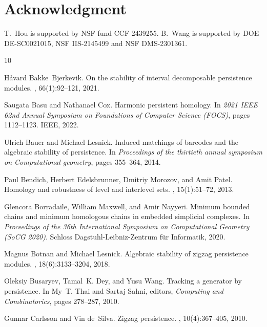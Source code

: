 \documentclass[10pt,a4paper]{amsart}
\theoremstyle{definition}
\theoremstyle{remark}
\begin{document}
\section*{Acknowledgment}
T.\ Hou is supported by NSF fund CCF 2439255. B.\ Wang is supported by DOE DE-SC0021015, NSF IIS-2145499 and NSF DMS-2301361. 
\begin{thebibliography}{10}

H{\aa}vard Bakke~Bjerkevik.
\newblock On the stability of interval decomposable persistence modules.
, 66(1):92--121, 2021.

Saugata Basu and Nathanael Cox.
\newblock Harmonic persistent homology.
\newblock In {\em 2021 IEEE 62nd Annual Symposium on Foundations of Computer
  Science (FOCS)}, pages 1112--1123. IEEE, 2022.

Ulrich Bauer and Michael Lesnick.
\newblock Induced matchings of barcodes and the algebraic stability of
  persistence.
\newblock In {\em Proceedings of the thirtieth annual symposium on
  Computational geometry}, pages 355--364, 2014.

Paul Bendich, Herbert Edelsbrunner, Dmitriy Morozov, and Amit Patel.
\newblock Homology and robustness of level and interlevel sets.
, 15(1):51--72, 2013.

Glencora Borradaile, William Maxwell, and Amir Nayyeri.
\newblock Minimum bounded chains and minimum homologous chains in embedded
  simplicial complexes.
\newblock In {\em Proceedings of the 36th International Symposium on
  Computational Geometry (SoCG 2020)}. Schloss Dagstuhl-Leibniz-Zentrum f{\"u}r
  Informatik, 2020.

Magnus Botnan and Michael Lesnick.
\newblock Algebraic stability of zigzag persistence modules.
, 18(6):3133--3204, 2018.

Oleksiy Busaryev, Tamal~K. Dey, and Yusu Wang.
\newblock Tracking a generator by persistence.
\newblock In My~T. Thai and Sartaj Sahni, editors, {\em Computing and
  Combinatorics}, pages 278--287, 2010.

Gunnar Carlsson and Vin de~Silva.
\newblock Zigzag persistence.
, 10(4):367--405, 2010.


\end{thebibliography}
\end{document}
